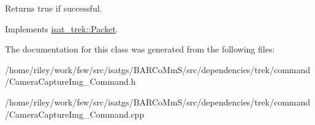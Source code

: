 \begin{DoxyReturn}{Returns}
true if successful. 
\end{DoxyReturn}


Implements \hyperlink{classisat__trek_1_1_packet}{isat\+\_\+trek\+::\+Packet}.



The documentation for this class was generated from the following files\+:\begin{DoxyCompactItemize}
\item 
/home/riley/work/fsw/src/isatgs/\+B\+A\+R\+Co\+Mm\+S/src/dependencies/trek/command/Camera\+Capture\+Img\+\_\+\+Command.\+h\item 
/home/riley/work/fsw/src/isatgs/\+B\+A\+R\+Co\+Mm\+S/src/dependencies/trek/command/Camera\+Capture\+Img\+\_\+\+Command.\+cpp\end{DoxyCompactItemize}
